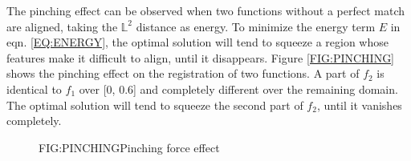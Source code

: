 

The pinching effect can be observed when
two functions without a
perfect match are aligned, taking the $\mathbb{L}^2$ distance as energy.
To minimize the
energy term $E$ in eqn. \ref{EQ:ENERGY}, the optimal solution will tend to squeeze
a region whose features make it difficult to align, until it disappears. Figure \ref{FIG:PINCHING}
shows the pinching effect on the registration of two functions.
A part of $f_2$ is identical to $f_1$ over [0, 0.6] and completely different
over the remaining domain. The optimal solution will tend to squeeze the second
part of $f_2$, until it vanishes completely.

\begin{figure}[Pinching force effect]{FIG:PINCHING}{Pinching force effect}
	 \quad
\end{figure}
